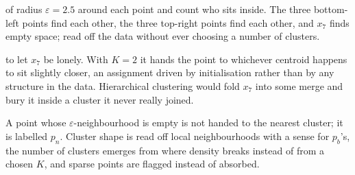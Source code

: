 
 of radius $\varepsilon{=}2.5$ around each point and count who sits inside.
The three bottom-left points find each other, the three top-right points find each other, and $x_7$ finds empty space; 
read off the data without ever choosing a number of clusters.

 to let $x_7$ be lonely.
With $K{=}2$ it hands the point to whichever centroid happens to sit slightly closer, 
an assignment driven by initialisation rather than by any structure in the data.
Hierarchical clustering would fold $x_7$ into some merge and bury it inside a cluster it never really joined.

A point whose $\varepsilon$-neighbourhood is empty is not handed to the nearest cluster; 
it is labelled $p_n$.
Cluster shape is read off local neighbourhoods with a sense for $p_b$'s, the number of clusters emerges 
from where density breaks instead of from a chosen $K$, and sparse points are flagged instead of absorbed.



